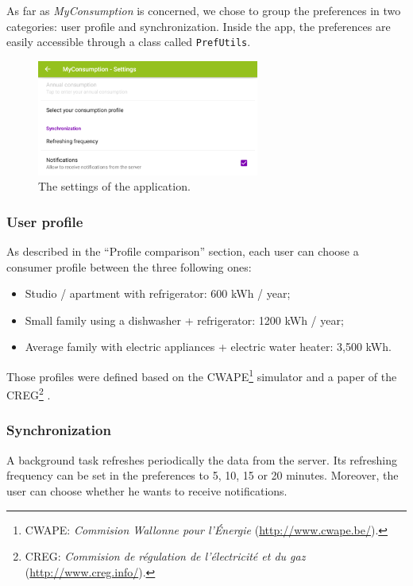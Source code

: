 \documentclass[a4paper, oneside, 11pt]{book}
\begin{document}
As far as \textit{MyConsumption} is concerned, we chose to group the preferences in two categories: user profile and synchronization. Inside the app, the preferences are easily accessible through a class called \texttt{PrefUtils}.

\begin{figure}[htbp]
	\centerline{\includegraphics[width=0.65\textwidth]{settings_land.png}}
	\caption{The settings of the application.}
	\label{fig:settings_land}
\end{figure}

\subsubsection{User profile}
As described in the “Profile comparison” section, each user can choose a consumer profile between the three following ones:
\begin{itemize}
	\item Studio / apartment with refrigerator: 600 kWh / year;
	\item Small family using a dishwasher + refrigerator: 1200 kWh / year;
	\item Average family with electric appliances + electric water heater: 3,500 kWh.
\end{itemize}
Those profiles were defined based on the CWAPE\footnote{CWAPE: \textit{Commision Wallonne pour l’Énergie} (\url{http://www.cwape.be/}).} simulator and a paper of the CREG\footnote{CREG: \textit{Commision de régulation de l’électricité et du gaz} (\url{http://www.creg.info/}).} \cite{CWAPE:online, creg:article}.

\subsubsection{Synchronization}
A background task refreshes periodically the data from the server. Its refreshing frequency can be set in the preferences to 5, 10, 15 or 20 minutes. Moreover, the user can choose whether he wants to receive notifications.
\end{document}
